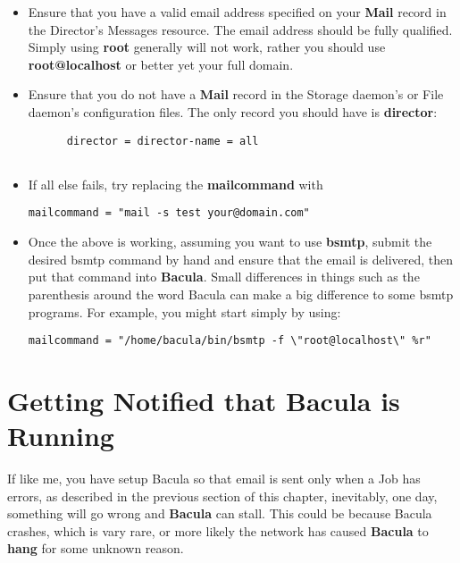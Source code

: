 \begin{itemize}
\item Ensure that you have a valid email address specified on your  {\bf Mail}
   record in the Director's Messages resource. The email  address should be fully
   qualified. Simply using {\bf root} generally  will not work, rather you should
use {\bf root@localhost} or better  yet your full domain.  
\item Ensure that you do not have a {\bf Mail} record in the Storage  daemon's
   or File daemon's configuration files. The only record  you should have is {\bf
   director}:  

\footnotesize
\begin{verbatim}
      director = director-name = all
      
\end{verbatim}
\normalsize

\item If all else fails, try replacing the {\bf mailcommand} with 

   \footnotesize
\begin{verbatim}
mailcommand = "mail -s test your@domain.com"
\end{verbatim}
\normalsize

\item Once the above is working, assuming you want to use {\bf bsmtp},  submit
   the desired bsmtp command by hand and ensure that the email  is delivered,
   then put that command into {\bf Bacula}. Small  differences in things such as
the parenthesis around the word  Bacula can make a big difference to some
bsmtp programs.  For example, you might start simply by using: 

\footnotesize
\begin{verbatim}
mailcommand = "/home/bacula/bin/bsmtp -f \"root@localhost\" %r"
\end{verbatim}
\normalsize

\end{itemize}

\section{Getting Notified that Bacula is Running}
\label{JobNotification}

If like me, you have setup Bacula so that email is sent only when a Job has
errors, as described in the previous section of this chapter, inevitably, one
day, something will go wrong and {\bf Bacula} can stall. This could be because
Bacula crashes, which is vary rare, or more likely the network has caused {\bf
Bacula} to {\bf hang} for some unknown reason. 

